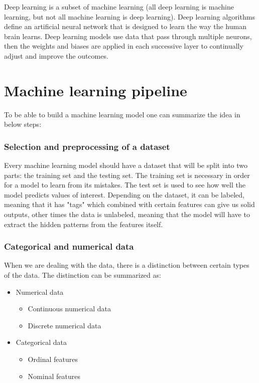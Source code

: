 \documentclass[a4paper,oneside,openright,11pt]{book}
\begin{document}
Deep learning is a subset of machine learning (all deep learning is machine learning, but not all machine learning is deep learning). Deep learning algorithms define an artificial neural network that is designed to learn the way the human brain learns. Deep learning models use data that pass through multiple neurons, then the weights and biases are applied in each successive layer to continually adjust and improve the outcomes.


\section{Machine learning pipeline}

To be able to build a machine learning model one can summarize the idea in below steps\cite{what_ML_IBM}:

\subsubsection{Selection and preprocessing of a dataset}

Every machine learning model should have a dataset that will be split into two parts: the training set and the testing set. The training set is necessary in order for a model to learn from its mistakes. The test set is used to see how well the model predicts values of interest. Depending on the dataset, it can be labeled, meaning that it has "tags" which combined with certain features can give us solid outputs, other times the data is unlabeled, meaning that the model will have to extract the hidden patterns from the features itself.

\subsubsection{Categorical and numerical data}

When we are dealing with the data, there is a distinction between certain types of the data. The distinction can be summarized as:

\begin{itemize}
    \item Numerical data
    \begin{itemize}
        \item Continuous numerical data
        \item Discrete numerical data
    \end{itemize}
    \item Categorical data
    \begin{itemize}
        \item Ordinal features
        \item Nominal features
    \end{itemize}
\end{itemize}
\end{document}
